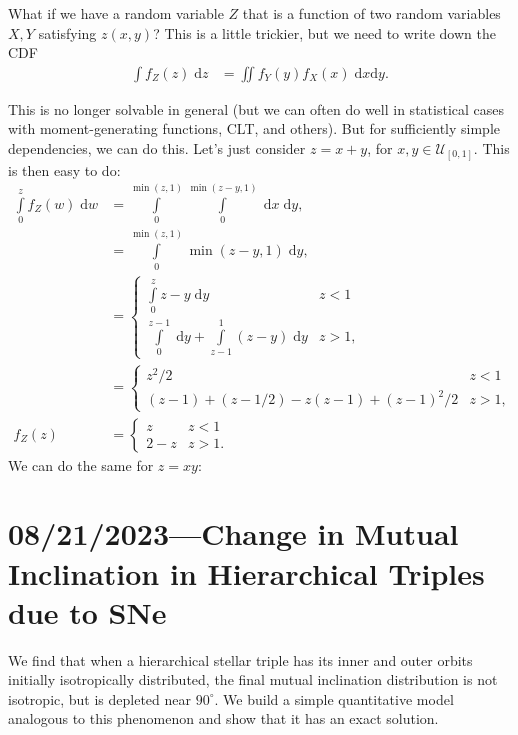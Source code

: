 \documentclass[12pt]{article}
\newcommand*{\p}[1]{\left(#1\right)}
\begin{document}
What if we have a random variable $Z$ that is a function of two random variables
$X, Y$ satisfying $z(x, y)$? This is a little trickier, but we need to write
down the CDF
\begin{align}
    \int\limits f_Z(z)\;\mathrm{d}z
        &= \iint\limits f_Y(y)f_X(x)\;\mathrm{d}x\mathrm{d}y.
\end{align}

This is no longer solvable in general (but we can often do well in statistical
cases with moment-generating functions, CLT, and others). But for sufficiently
simple dependencies, we can do this. Let's just consider $z = x + y$, for $x, y
\in \mathcal{U}_{[0, 1]}$. This is then easy to do:
\begin{align}
    \int\limits_0^z f_Z(w)\;\mathrm{d}w
        &= \int\limits_0^{\min(z, 1)}
            \int\limits_{0}
                ^{\min(z - y, 1)}\;\mathrm{d}x\;\mathrm{d}y,\\
        &= \int\limits_0^{\min(z, 1)}
            \min\p{z - y, 1}\;\mathrm{d}y,\\
        &=
        \begin{cases}
            \int\limits_0^z
                z - y\;\mathrm{d}y & z < 1\\[10pt]
            \int\limits_0^{z - 1}
                \;\mathrm{d}y +
            \int\limits_{z - 1}^1
                (z - y)\;\mathrm{d}y & z > 1,
        \end{cases}\\
        &=
        \begin{cases}
            z^2 / 2 & z < 1\\
            (z - 1) + (z - 1/2) - z(z-1) + (z - 1)^2/2 & z > 1,
        \end{cases}\\
    f_Z(z) &=
        \begin{cases}
            z & z < 1\\
            2 - z & z > 1.
        \end{cases}
\end{align}
We can do the same for $z = xy$:

\section{08/21/2023---Change in Mutual Inclination in Hierarchical Triples due to SNe}

We find that when a hierarchical stellar triple has its inner and outer orbits
initially isotropically distributed, the final mutual inclination distribution
is not isotropic, but is depleted near $90^\circ$. We build a simple
quantitative model analogous to this phenomenon and show that it has an exact
solution.
\end{document}
